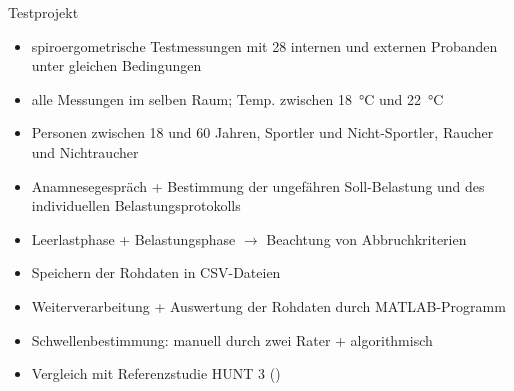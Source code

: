 \documentclass[colorBG,slideColor,8pt]{beamer}
\begin{document}
\begin{frame}{Testprojekt}
\begin{itemize}
	\item spiroergometrische Testmessungen mit 28 internen und externen Probanden unter gleichen Bedingungen
	\item alle Messungen im selben Raum; Temp. zwischen \SI{18}{\degreeCelsius} und \SI{22}{\degreeCelsius}
	\item Personen zwischen 18 und 60 Jahren, Sportler und Nicht-Sportler, Raucher und Nichtraucher
	\item Anamnesegespräch + Bestimmung der ungefähren Soll-Belastung und des individuellen Belastungsprotokolls
	\item Leerlastphase + Belastungsphase $\rightarrow$ Beachtung von Abbruchkriterien
	\item Speichern der Rohdaten in CSV-Dateien
	\item Weiterverarbeitung + Auswertung der Rohdaten durch MATLAB-Programm
	\item Schwellenbestimmung: manuell durch zwei Rater + algorithmisch
	\item Vergleich mit Referenzstudie HUNT 3 (\cite{Loe.2014})
\end{itemize}
\end{frame}
\end{document}
